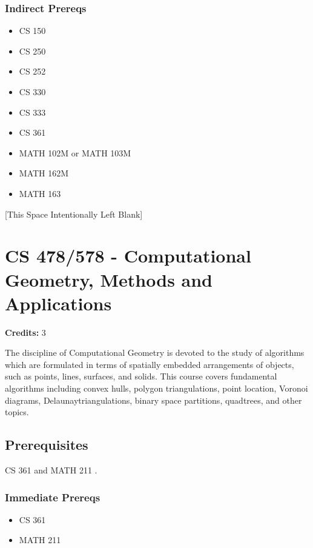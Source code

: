 \documentclass[]{article}
\providecommand{\tightlist}{%
  \setlength{\itemsep}{0pt}\setlength{\parskip}{0pt}}
\newcommand{\pagebreakhere}{
\vspace*{\fill}
\begin{center}
[This Space Intentionally Left Blank]
\end{center}
\vspace*{\fill}
\newpage
}
\begin{document}
\subsubsection{Indirect Prereqs}\label{indirect-prereqs-37}

\begin{itemize}
\tightlist
\item
  CS 150
\item
  CS 250
\item
  CS 252
\item
  CS 330
\item
  CS 333
\item
  CS 361
\item
  MATH 102M or MATH 103M
\item
  MATH 162M
\item
  MATH 163
\end{itemize}

\pagebreakhere
\section{CS 478/578 - Computational Geometry, Methods and
Applications}\label{cs-478578---computational-geometry-methods-and-applications}

\textbf{Credits:} 3

The discipline of Computational Geometry is devoted to the study of
algorithms which are formulated in terms of spatially embedded
arrangements of objects, such as points, lines, surfaces, and solids.
This course covers fundamental algorithms including convex hulls,
polygon triangulations, point location, Voronoi diagrams,
Delaunaytriangulations, binary space partitions, quadtrees, and other
topics.

\subsection{Prerequisites}\label{prerequisites-47}

CS 361 and MATH 211 .

\subsubsection{Immediate Prereqs}\label{immediate-prereqs-38}

\begin{itemize}
\tightlist
\item
  CS 361
\item
  MATH 211
\end{itemize}
\end{document}
